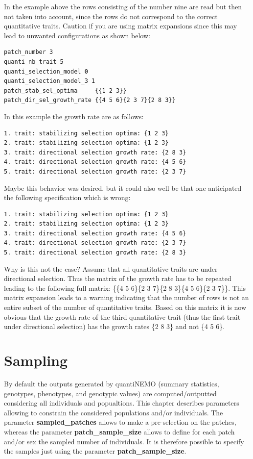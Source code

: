 \documentclass[letterpaper,12pt,oneside]{book}
\begin{document}
In the example above the rows consisting of the number nine are read but then not taken into account, since the rows do not correspond to the correct quantitative traits. Caution if you are using matrix expansions since this may lead to unwanted configurations as shown below:
\begin{lstlisting}[frame=single]
patch_number 3
quanti_nb_trait 5 
quanti_selection_model 0	
quanti_selection_model_3 1
patch_stab_sel_optima     {{1 2 3}}
patch_dir_sel_growth_rate {{4 5 6}{2 3 7}{2 8 3}}
\end{lstlisting}
In this example the growth rate are as follows:
\begin{lstlisting}[frame=single]
1. trait: stabilizing selection optima: {1 2 3}
2. trait: stabilizing selection optima: {1 2 3}
3. trait: directional selection growth rate: {2 8 3}
4. trait: directional selection growth rate: {4 5 6}
5. trait: directional selection growth rate: {2 3 7}
\end{lstlisting}
Maybe this behavior was desired, but it could also well be that one anticipated the following specification which is wrong:
\begin{lstlisting}[frame=single]
1. trait: stabilizing selection optima: {1 2 3}
2. trait: stabilizing selection optima: {1 2 3}
3. trait: directional selection growth rate: {4 5 6}
4. trait: directional selection growth rate: {2 3 7}
5. trait: directional selection growth rate: {2 8 3}
\end{lstlisting}
Why is this not the case? Assume that all quantitative traits are under directional selection. Thus the matrix of the growth rate has to be repeated leading to the following full matrix: \{\{4 5 6\}\{2 3 7\}\{2 8 3\}\{4 5 6\}\{2 3 7\}\}. This matrix expansion leads to a warning indicating that the number of rows is not an entire subset of the number of quantitative traits. Based on this matrix it is now obvious that the growth rate of the third quantitative trait (thus the first trait under directional selection) has the growth rates \{2 8 3\} and not \{4 5 6\}.

\section{Sampling}\label{sampling}
By default the outputs generated by quantiNEMO (summary statistics, genotypes, phenotypes, and genotypic values) are computed/outputted considering all individuals and popualtions. This chapter describes parameters allowing to constrain the considered populations and/or individuals. The parameter \textbf{sampled\_patches} allows to make a pre-selection on the patches, whereas the parameter \textbf{patch\_sample\_size} allows to define for each patch and/or sex the sampled number of individuals. It is therefore possible to specify the samples just using the parameter \textbf{patch\_sample\_size}.
 
\end{document}
